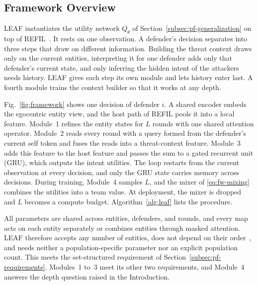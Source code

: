 \subsection{Framework Overview}
\label{subsec:method-overview}
LEAF instantiates the utility network $Q_\theta$ of Section~\ref{subsec:pf-generalization} on top of REFIL~\cite{iqbal2021refil}. It rests on one observation. A defender's decision separates into three steps that draw on different information. Building the threat context draws only on the current entities, interpreting it for one defender adds only that defender's current state, and only inferring the hidden intent of the attackers needs history. LEAF gives each step its own module and lets history enter last. A fourth module trains the context builder so that it works at any depth.

Fig.~\ref{fig:framework} shows one decision of defender $i$. A shared encoder embeds the egocentric entity view, and the host path of REFIL pools it into a local feature. Module~1 refines the entity states for $L$ rounds with one shared attention operator. Module~2 reads every round with a query formed from the defender's current self token and fuses the reads into a threat-context feature. Module~3 adds this feature to the host feature and passes the sum to a gated recurrent unit (GRU), which outputs the intent utilities. The loop restarts from the current observation at every decision, and only the GRU state carries memory across decisions. During training, Module~4 samples $L$, and the mixer of \eqref{eq:fw-mixing} combines the utilities into a team value. At deployment, the mixer is dropped and $L$ becomes a compute budget. Algorithm~\ref{alg:leaf} lists the procedure.

All parameters are shared across entities, defenders, and rounds, and every map acts on each entity separately or combines entities through masked attention. LEAF therefore accepts any number of entities, does not depend on their order~\cite{lee2019settransformer}, and needs neither a population-specific parameter nor an explicit population count. This meets the set-structured requirement of Section~\ref{subsec:pf-requirements}. Modules~1 to~3 meet its other two requirements, and Module~4 answers the depth question raised in the Introduction.

